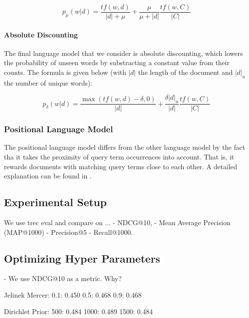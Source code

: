 \begin{equation*}
p_{\mu}(w | d) = \frac{tf(w,d)}{|d| + \mu}  + \frac{\mu}{\mu + |d|} \frac{tf(w,C)}{|C|}  
\end{equation*}


\paragraph{Absolute Discounting}

The final language model that we consider is absolute discounting,
which lowers the probability of unseen words by substracting a constant
value from their counts.
The formula is given below (with $|d|$ the length of the document and $|d|_u$ the number 
of unique words):

\begin{equation*}
p_{\delta}(w | d) = \frac{\max(tf(w,d) - \delta, 0)}{|d|} + \frac{\delta |d|_{u}}{|d|} \frac{tf(w,C)}{|C|}  
\end{equation*}


\subsubsection{Positional Language Model}

The positional language model differs from the other
language model by the fact tha it takes the proximity
of query term occurrences into account. That is,
it rewards documents with matching query terms
close to each other. A detailed explanation
can be found in \cite{PLM}.


\subsection{Experimental Setup}



We use trec eval and compare on ...
- NDCG@10, 
- Mean Average Precision (MAP@1000) 
- Precision@5
- Recall@1000.

\subsection{Optimizing Hyper Parameters}

- We use NDCG@10 as a metric. Why?

Jelinek Mercer:
0.1: 0.450
0.5: 0.468
0.9: 0.468

Dirichlet Prior:
500: 0.484
1000: 0.489
1500: 0.484

